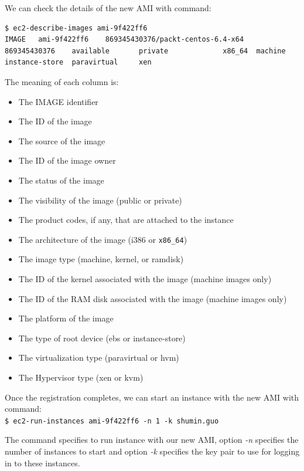 We can check the details of the new AMI with command:
\lstset{style=bashstyle}
\begin{lstlisting}
$ ec2-describe-images ami-9f422ff6
IMAGE   ami-9f422ff6    869345430376/packt-centos-6.4-x64       869345430376    available       private             x86_64  machine                         instance-store  paravirtual     xen
\end{lstlisting}

The meaning of each column is:
\begin{itemize}
  \item The IMAGE identifier
  \item The ID of the image
  \item The source of the image
  \item The ID of the image owner
  \item The status of the image
  \item The visibility of the image (public or private)
  \item The product codes, if any, that are attached to the instance
  \item The architecture of the image (i386 or \verb|x86_64|)
  \item The image type (machine, kernel, or ramdisk)
  \item The ID of the kernel associated with the image (machine images only)
  \item The ID of the RAM disk associated with the image (machine images only)
  \item The platform of the image
  \item The type of root device (ebs or instance-store)
  \item The virtualization type (paravirtual or hvm)
  \item The Hypervisor type (xen or kvm)
\end{itemize}

Once the registration completes, we can start an instance with the new AMI with command: \\
\verb|$ ec2-run-instances ami-9f422ff6 -n 1 -k shumin.guo|

The command specifies to run instance with our new AMI, option \emph{-n} specifies the number of instances to start and option \emph{-k} specifies the key pair to use for logging in to these instances.

